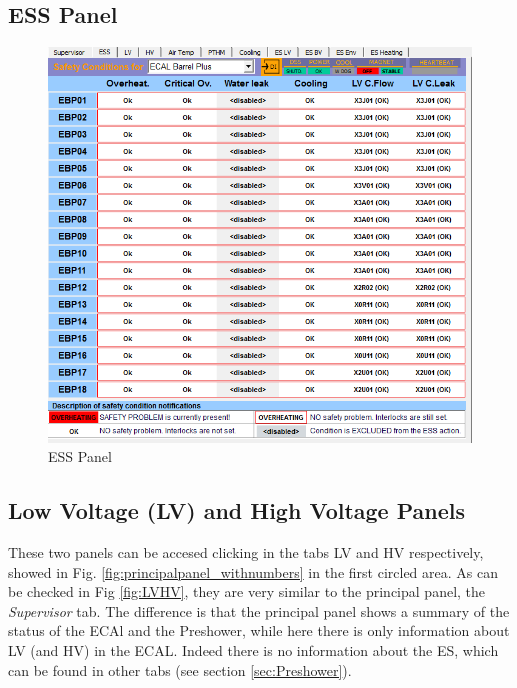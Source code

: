 \documentclass[12pt]{article}
\begin{document}
\subsection{ESS Panel}
\label{sec:ESS}
\begin{figure}[!h]
	\centering
	\includegraphics[width=1\textwidth]{Pics/ESS_panel.png}
	\caption{ESS Panel}
	
\end{figure}

\subsection{Low Voltage (LV) and High Voltage Panels}
These two panels can be accesed clicking in the tabs LV and HV respectively, showed in Fig. \ref{fig:principalpanel_withnumbers} in the first circled area. As can be checked in Fig \ref{fig:LVHV}, they are very similar to the principal panel, the \textit{Supervisor} tab. The difference is that the principal panel shows a summary of the status of the ECAl and the Preshower, while here there is only information about LV (and HV) in the ECAL. Indeed there is no information about the ES, which can be found in other tabs (see section \ref{sec:Preshower}).
\end{document}

